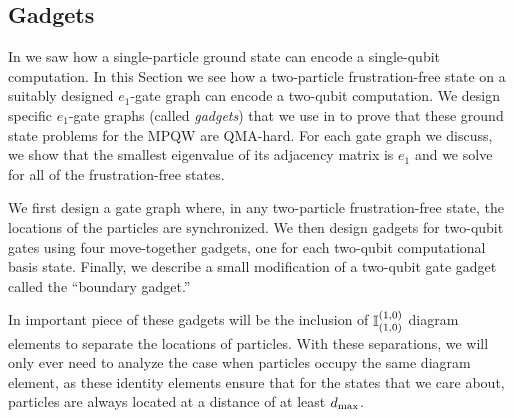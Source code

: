 \documentclass[../thesis-main/thesis-main]{subfiles}
\begin{document}
%
%


\subsection{Gadgets}

In  we saw how a single-particle ground state can encode a single-qubit computation. In this Section we see how a two-particle frustration-free state on a suitably designed $e_{1}$-gate graph can encode a two-qubit computation. We design specific $e_{1}$-gate graphs (called \emph{gadgets}) that we use in  to prove that these ground state problems for the MPQW are QMA-hard. For each gate graph we discuss, we show that the smallest eigenvalue of its adjacency matrix is $e_{1}$ and we solve for all of the frustration-free states.

We first design a gate graph where, in any two-particle frustration-free state, the locations of the particles are synchronized.  We then design gadgets for two-qubit gates using four move-together gadgets, one for each two-qubit computational basis state. Finally, we describe a small modification of a two-qubit gate gadget called the ``boundary gadget.''

In important piece of these gadgets will be the inclusion of $\mathbb{I}_{(1,0)}^{(1,0)}$ diagram elements to separate the locations of particles.  With these separations, we will only ever need to analyze the case when particles occupy the same diagram element, as these identity elements ensure that for the states that we care about, particles are always located at a distance of at least $d_{\text{max}}$.
\end{document}

